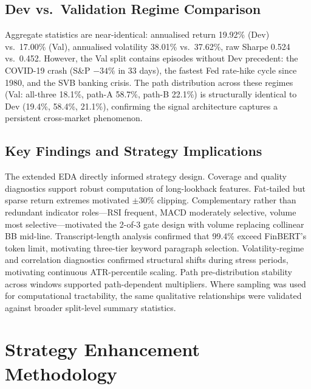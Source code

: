 \documentclass[11pt,twoside,a4paper]{article}
\begin{document}
\subsection{Dev vs.\ Validation Regime Comparison}

Aggregate statistics are near-identical: annualised return 19.92\% (Dev) vs.\ 17.00\% (Val), annualised volatility 38.01\% vs.\ 37.62\%, raw Sharpe 0.524 vs.\ 0.452. However, the Val split contains episodes without Dev precedent: the COVID-19 crash (S\&P $-34\%$ in 33 days), the fastest Fed rate-hike cycle since 1980, and the SVB banking crisis. The path distribution across these regimes (Val: all-three 18.1\%, path-A 58.7\%, path-B 22.1\%) is structurally identical to Dev (19.4\%, 58.4\%, 21.1\%), confirming the signal architecture captures a persistent cross-market phenomenon.

\subsection{Key Findings and Strategy Implications}

The extended EDA directly informed strategy design. Coverage and quality diagnostics support robust computation of long-lookback features. Fat-tailed but sparse return extremes motivated $\pm 30\%$ clipping. Complementary rather than redundant indicator roles---RSI frequent, MACD moderately selective, volume most selective---motivated the 2-of-3 gate design with volume replacing collinear BB mid-line. Transcript-length analysis confirmed that 99.4\% exceed FinBERT's token limit, motivating three-tier keyword paragraph selection. Volatility-regime and correlation diagnostics confirmed structural shifts during stress periods, motivating continuous ATR-percentile scaling. Path pre-distribution stability across windows supported path-dependent multipliers. Where sampling was used for computational tractability, the same qualitative relationships were validated against broader split-level summary statistics.

\clearpage
\section{Strategy Enhancement Methodology}
\end{document}
